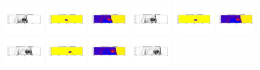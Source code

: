 \documentclass[11pt]{article}
\begin{document}
\vskip 10pt 
\includegraphics[width=0.158333333333\textwidth]{frame0006fig0.png}
\includegraphics[width=0.158333333333\textwidth]{frame0006fig1.png}
\includegraphics[width=0.158333333333\textwidth]{frame0006fig2.png}
\includegraphics[width=0.158333333333\textwidth]{frame0007fig0.png}
\includegraphics[width=0.158333333333\textwidth]{frame0007fig1.png}
\includegraphics[width=0.158333333333\textwidth]{frame0007fig2.png}
\vskip 10pt 
\includegraphics[width=0.158333333333\textwidth]{frame0008fig0.png}
\includegraphics[width=0.158333333333\textwidth]{frame0008fig1.png}
\includegraphics[width=0.158333333333\textwidth]{frame0008fig2.png}
\includegraphics[width=0.158333333333\textwidth]{frame0009fig0.png}
\end{document}
